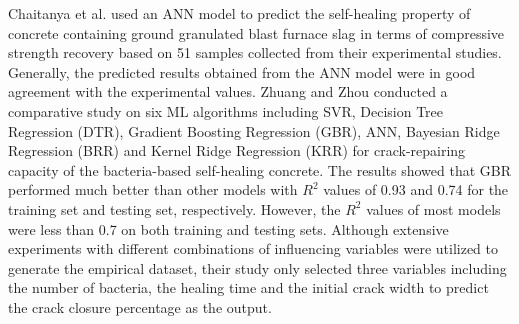 \documentclass[11pt]{article}
\begin{document}
		
		
	
	Chaitanya et al. \cite{chaitanya2020prediction} used an ANN model to predict the self-healing property of concrete containing ground granulated blast furnace slag in terms of compressive strength recovery based on 51 samples collected from their experimental studies. Generally, the  predicted  results  obtained  from  the  ANN model  were  in good agreement with the experimental values. Zhuang and Zhou \cite{zhuang2019prediction} conducted a comparative study on six ML algorithms including SVR, Decision Tree Regression (DTR), Gradient Boosting Regression (GBR), ANN, Bayesian Ridge Regression (BRR) and Kernel Ridge Regression (KRR) for crack-repairing capacity of the bacteria-based self-healing concrete. The results showed that GBR performed much better than other models with $R^2$ values of 0.93 and 0.74 for the training set and testing set, respectively. However, the $R^2$ values of most models were less than 0.7 on both training and testing sets. Although extensive experiments with different combinations of influencing variables were utilized to generate the empirical dataset, their study only selected three variables including the number of bacteria, the healing time and the initial crack width to predict the crack closure percentage as the output.
	
\end{document}
